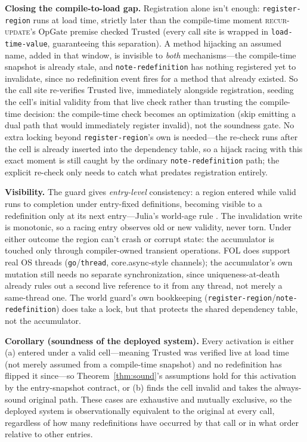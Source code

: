 \documentclass[sigplan,review,anonymous]{acmart}
\begin{document}
\textbf{Closing the compile-to-load gap.} Registration alone isn't enough: \texttt{register-region} runs at load time, strictly later than the compile-time moment \textsc{recur-update}'s $\mathrm{OpGate}$ premise checked $\mathrm{Trusted}$ (every call site is wrapped in \texttt{load-time-value}, guaranteeing this separation). A method hijacking an assumed name, added in that window, is invisible to \emph{both} mechanisms---the compile-time snapshot is already stale, and \texttt{note-redefinition} has nothing registered yet to invalidate, since no redefinition event fires for a method that already existed. So the call site re-verifies $\mathrm{Trusted}$ live, immediately alongside registration, seeding the cell's initial validity from that live check rather than trusting the compile-time decision: the compile-time check becomes an optimization (skip emitting a dual path that would immediately register invalid), not the soundness gate. No extra locking beyond \texttt{register-region}'s own is needed---the re-check runs after the cell is already inserted into the dependency table, so a hijack racing with this exact moment is still caught by the ordinary \texttt{note-redefinition} path; the explicit re-check only needs to catch what predates registration entirely.

\textbf{Visibility.} The guard gives \emph{entry-level} consistency: a region entered while valid runs to completion under entry-fixed definitions, becoming visible to a redefinition only at its next entry---Julia's world-age rule \cite{belyakova2020jit}. The invalidation write is monotonic, so a racing entry observes old or new validity, never torn. Under either outcome the region can't crash or corrupt state: the accumulator is touched only through compiler-owned transient operations. FOL does support real OS threads (\texttt{go}/\texttt{thread}, core.async-style channels); the accumulator's own mutation still needs no separate synchronization, since uniqueness-at-death already rules out a second live reference to it from any thread, not merely a same-thread one. The world guard's own bookkeeping (\texttt{register-region}/\texttt{note-redefinition}) does take a lock, but that protects the shared dependency table, not the accumulator.

\textbf{Corollary (soundness of the deployed system).} Every activation is either (a) entered under a valid cell---meaning $\mathrm{Trusted}$ was verified live at load time (not merely assumed from a compile-time snapshot) and no redefinition has flipped it since---so Theorem~\ref{thm:sound}'s assumptions hold for this activation by the entry-snapshot contract, or (b) finds the cell invalid and takes the always-sound original path. These cases are exhaustive and mutually exclusive, so the deployed system is observationally equivalent to the original at every call, regardless of how many redefinitions have occurred by that call or in what order relative to other entries.
\end{document}
